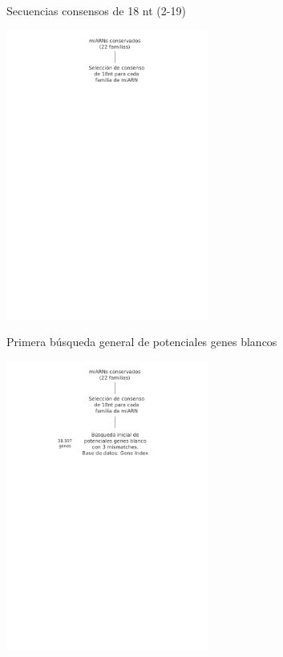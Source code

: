 \documentclass{beamer}
\begin{document}
\begin{frame}{Secuencias consensos de 18 nt (2-19)}
	\begin{center}
		\includegraphics[width=0.5\textwidth]{img/NAR_fig1_02.png}
	\end{center}
\end{frame}

\begin{frame}{Primera búsqueda general de potenciales genes blancos}
	\begin{center}
		\includegraphics[width=0.5\textwidth]{img/NAR_fig1_03.png}
	\end{center}
\end{frame}
\end{document}
